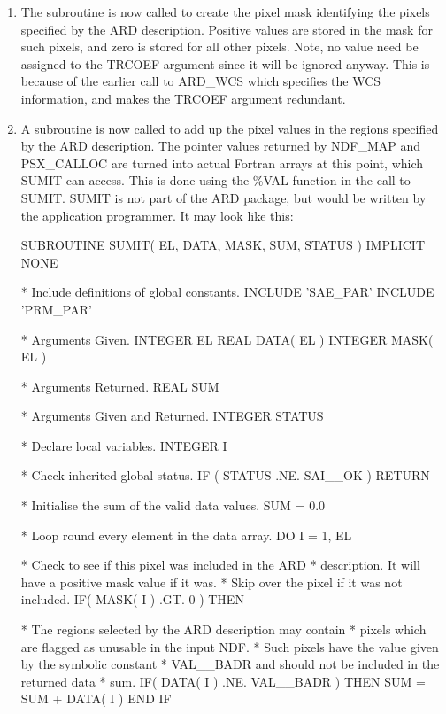 \documentclass[11pt,nolof]{starlink}
\begin{document}
\begin{enumerate}
\item The subroutine  is now called to create
the pixel mask identifying the pixels specified by the ARD description.
Positive values are stored in the mask for such pixels, and zero is
stored for all other pixels. Note, no value need be assigned to the TRCOEF
argument since it will be ignored anyway. This is because of the earlier call
to ARD\_WCS which specifies the WCS information, and makes the TRCOEF
argument redundant.

\item A subroutine is now called to add up the pixel values in the regions
specified by the ARD description. The pointer values returned by NDF\_MAP and
PSX\_CALLOC are turned into actual Fortran arrays at this point, which SUMIT can
access. This is done using the \%VAL function in the call to SUMIT. SUMIT
is not part of the ARD package, but would be written by the application
programmer. It may look like this:

\small
\begin{terminalv}
      SUBROUTINE SUMIT( EL, DATA, MASK, SUM, STATUS )
      IMPLICIT NONE

*  Include definitions of global constants.
      INCLUDE 'SAE_PAR'
      INCLUDE 'PRM_PAR'

*  Arguments Given.
      INTEGER EL
      REAL DATA( EL )
      INTEGER MASK( EL )

*  Arguments Returned.
      REAL SUM

*  Arguments Given and Returned.
      INTEGER STATUS

*  Declare local variables.
      INTEGER I

*  Check inherited global status.
      IF ( STATUS .NE. SAI__OK ) RETURN

*  Initialise the sum of the valid data values.
      SUM = 0.0

*  Loop round every element in the data array.
      DO I = 1, EL

*  Check to see if this pixel was included in the ARD
*  description. It will have a positive mask value if it was.
*  Skip over the pixel if it was not included.
         IF( MASK( I ) .GT. 0 ) THEN

*  The regions selected by the ARD description may contain
*  pixels which are flagged as unusable in the input NDF.
*  Such pixels have the value given by the symbolic constant
*  VAL__BADR and should not be included in the returned data
*  sum.
            IF( DATA( I ) .NE. VAL__BADR ) THEN
               SUM = SUM + DATA( I )
            END IF


\end{terminalv}
\end{enumerate}
\end{document}
